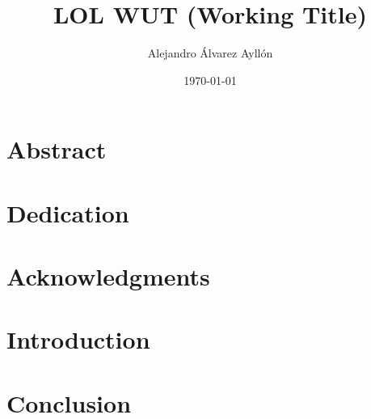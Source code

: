 \documentclass[12pt]{book}
\title{LOL WUT (Working Title)}
\author{Alejandro Álvarez Ayllón}
\date{\today}
\begin{document}
\frontmatter



\chapter*{Abstract}
\lipsum[1-5]

\chapter*{Dedication}
\lipsum[10-12]

\chapter*{Acknowledgments}
\lipsum[10-11]

\tableofcontents

\mainmatter

\chapter{Introduction}
\lipsum[1-10]

\chapter{Conclusion}


\backmatter

\begin{refsection}
\nocite{Alvarez2019}

\printbibliography[heading=bibintoc,title={List of Publications}]
\end{refsection}
\end{document}
